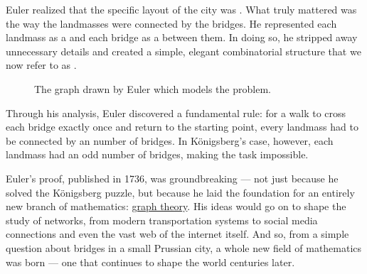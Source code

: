 \documentclass[a4paper, 12pt]{report}
\begin{document}
    Euler realized that the specific layout of the city was . What truly mattered was the way the landmasses were connected by the bridges. He represented each landmass as a  and each bridge as a  between them. In doing so, he stripped away unnecessary details and created a simple, elegant combinatorial structure that we now refer to as .

    \begin{figure}[H]
        \centering
        \caption{The graph drawn by Euler which models the  problem.}
        \label{konigsberg}
    \end{figure}

    Through his analysis, Euler discovered a fundamental rule: for a walk to cross each bridge exactly once and return to the starting point, every landmass had to be connected by an  number of bridges. In Königsberg's case, however, each landmass had an odd number of bridges, making the task impossible.

    Euler's proof, published in 1736, was groundbreaking --- not just because he solved the Königsberg puzzle, but because he laid the foundation for an entirely new branch of mathematics: \href{https://en.wikipedia.org/wiki/Graph_theory}{graph theory}. His ideas would go on to shape the study of networks, from modern transportation systems to social media connections and even the vast web of the internet itself. And so, from a simple question about bridges in a small Prussian city, a whole new field of mathematics was born --- one that continues to shape the world centuries later.
\end{document}
